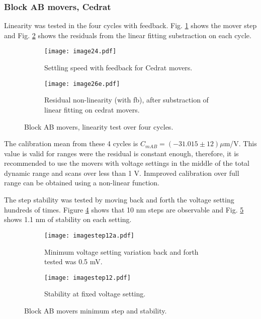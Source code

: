 \subsubsection{Block AB movers, Cedrat}
Linearity was tested in the four cycles with feedback. Fig. \ref{f:Cedratmsteps} shows the mover step and Fig. \ref{f:Cedratlinres} shows the residuals from the linear fitting substraction on each cycle.\par
\begin{figure}[!htb]
 \centering\hspace*{-0.6cm}
\begin{subfigure}{0.4\textwidth}
 \texttt{[image: image24.pdf]}\caption{Settling speed with feedback for Cedrat movers.}\label{f:Cedratmsteps}
\end{subfigure}\hspace*{1.5cm}
\begin{subfigure}{0.4\textwidth}
 \texttt{[image: image26e.pdf]}\caption{Residual non-linearity (with fb), after substraction of linear fitting on cedrat movers.}\label{f:Cedratlinres}
\end{subfigure}\caption{Block AB movers, linearity test over four cycles.}\label{f:Cedratfeedback}
\end{figure}
The calibration mean from these 4 cycles is $C_{mAB} = (-31.015\pm12)\mu$m/V. This value is valid for ranges were the residual is constant enough, therefore, it is recommended to use the movers with voltage settings in the middle of the total dynamic range and scans over less than 1 V. Inmproved calibration over full range can be obtained using a non-linear function.\par
The step stability was tested by moving back and forth the voltage setting hundreds of times. Figure \ref{f:Cedratstepstab} shows that 10 nm steps are observable and Fig. \ref{f:Cedratstab} shows 1.1 nm of stability on each setting.\par
\begin{figure}[!htb]
 \centering\hspace*{-0.6cm}
\begin{subfigure}{0.4\textwidth}
\texttt{[image: imagestep12a.pdf]}\caption{Minimum voltage setting variation back and forth tested was 0.5 mV.}\label{f:Cedratstepstab}
\end{subfigure}\hspace*{1.5cm}
\begin{subfigure}{0.4\textwidth}
 \texttt{[image: imagestep12.pdf]}\caption{Stability at fixed voltage setting.}\label{f:Cedratstab}
\end{subfigure}\caption{Block AB movers minimum step and stability.}\label{f:Cedratstability}
\end{figure}
